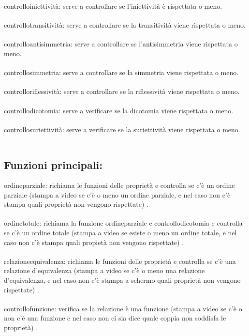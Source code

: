 \documentclass[11pt, a4paper, titlepage, block]{article}
\begin{document}
	controllo\textunderscore iniettivit\`a:  serve a controllare se l'iniettivit\`a \`e rispettata o meno.\\
	\\
	controllo\textunderscore transitivit\`a:  serve a controllare se la transitivit\`a 
	viene rispettata o meno.\\
	\\
	controllo\textunderscore antisimmetria:  serve a controllare se l'antisimmetria viene rispettata o meno.\\
	\\
	controllo\textunderscore simmetria:  serve a controllare se la simmetria viene rispettata o meno.\\
	\\
	controllo\textunderscore riflessivit\`a:  serve a controllare se la riflessivit\`a viene rispettata o meno.\\
	\\
	controllo\textunderscore dicotomia:  serve a verificare se la dicotomia viene rispettata o meno.\\
	\\
	controllo\textunderscore suriettivit\`a:  serve a verificare se la suriettivit\`a viene rispettata o meno.\\
	\\
	\newpage
	\subsection{Funzioni principali:}
	ordine\textunderscore parziale:  richiama le funzioni delle propriet\`a e controlla se c'\`e un ordine parziale (stampa a video se c'\`e o meno un ordine parziale, e nel caso non c'\`e stampa quali propriet\`a non vengono rispettate) .\\
	\\
	ordine\textunderscore totale:  richiama la funzione ordine\textunderscore parziale e controllo\textunderscore dicotomia e controlla se c'\`e un ordine totale (stampa a video se esiste o meno un ordine totale, e nel caso non c'\`e stampa quali propiet\`a non vengono rispettate) .\\
	\\
	relazione\textunderscore equivalenza:  richiama le funzioni delle propriet\`a e controlla se c'\`e una relazione d'equivalenza (stampa a video se c'\`e o meno una relazione d'equivalenza, e nel caso non c'\`e stampa a schermo quali propriet\`a non vengono rispettate) .\\
	\\
	controllo\textunderscore funzione: verifica se la relazione \`e una funzione (stampa  a video se c'\`e o non c'\`e una funzione e nel caso non ci sia dice quale coppia non soddisfa le propriet\`a) .\\
	\\
	\newpage  
\end{document}
